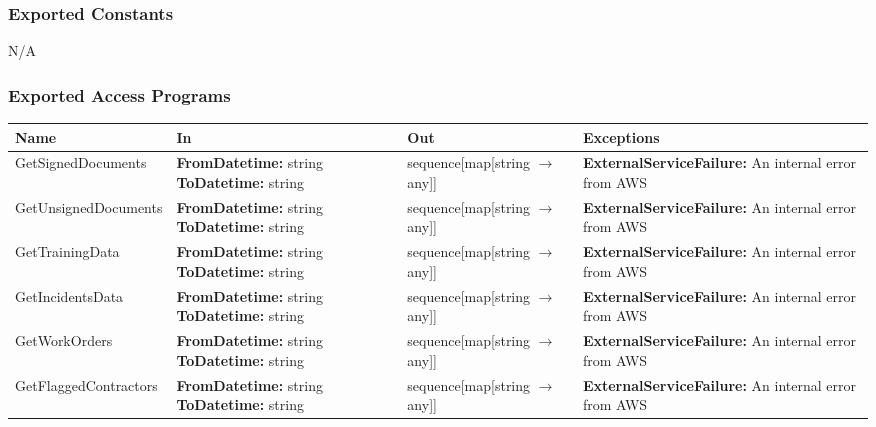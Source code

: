 \documentclass[12pt, titlepage]{article}
\begin{document}
\subsubsection{Exported Constants}
N/A

\subsubsection{Exported Access Programs}

\begin{center}
  \begin{tabular}{p{4.5cm} p{4cm} p{4cm} p{4cm}}
    \hline
    \textbf{Name} & \textbf{In} & \textbf{Out} & \textbf{Exceptions} \\
    \hline

    GetSignedDocuments & \textbf{FromDatetime:} string \newline
    \textbf{ToDatetime:} string&
    sequence[map[string $\rightarrow$ any]] &
    \textbf{ExternalServiceFailure:} An internal error from AWS
    \\
    \hline
    GetUnsignedDocuments & \textbf{FromDatetime:} string \newline
    \textbf{ToDatetime:} string&
    sequence[map[string $\rightarrow$ any]] &
    \textbf{ExternalServiceFailure:} An internal error from AWS
    \\
    \hline
    GetTrainingData & \textbf{FromDatetime:} string \newline
    \textbf{ToDatetime:} string&
    sequence[map[string $\rightarrow$ any]] &
    \textbf{ExternalServiceFailure:} An internal error from AWS
    \\
    \hline
    GetIncidentsData & \textbf{FromDatetime:} string \newline
    \textbf{ToDatetime:} string&
    sequence[map[string $\rightarrow$ any]] &
    \textbf{ExternalServiceFailure:} An internal error from AWS
    \\
    \hline
    GetWorkOrders & \textbf{FromDatetime:} string \newline
    \textbf{ToDatetime:} string&
    sequence[map[string $\rightarrow$ any]] &
    \textbf{ExternalServiceFailure:} An internal error from AWS
    \\
    \hline
    GetFlaggedContractors & \textbf{FromDatetime:} string \newline
    \textbf{ToDatetime:} string&
    sequence[map[string $\rightarrow$ any]] &
    \textbf{ExternalServiceFailure:} An internal error from AWS\\
    \hline
  \end{tabular}
\end{center}
\end{document}
